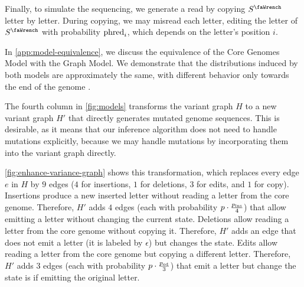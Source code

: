 Finally, to simulate the sequencing, we generate a read by copying $\seq^\gmut$ letter by letter.
During copying, we may misread each letter, editing the  letter of $\seq^\gmut$ with probability $\text{phred}_{i}$, which depends on the letter's position $i$.

In \cref{app:model-equivalence}, we discuss the equivalence of the Core Genomes Model with the Graph Model.
We demonstrate that the distributions induced by both models are approximately the same, with different behavior only towards the end of the genome .

The fourth column in \cref{fig:models} transforms the variant graph $H$ to a new variant graph $H'$ that directly generates mutated genome sequences.
This is desirable, as it means that our inference algorithm does not need to handle mutations explicitly, because we may handle mutations by incorporating them into the variant graph directly.

\cref{fig:enhance-variance-graph} shows this transformation, which replaces every edge $e$ in $H$ by $9$ edges ($4$ for insertions, $1$ for deletions, $3$ for edits, and $1$ for copy).
Insertions produce a new inserted letter without reading a letter from the core genome.
Therefore, $H'$ adds $4$ edges (each with probability $p \cdot \frac{p_\text{ins}}{4}$) that allow emitting a letter without changing the current state.
Deletions allow reading a letter from the core genome without copying it.
Therefore, $H'$ adds an edge that does not emit a letter (it is labeled by $\epsilon$) but changes the state.
Edits allow reading a letter from the core genome but copying a different letter.
Therefore, $H'$ adds $3$ edges (each with probability $p \cdot \frac{p_\text{ed}}{3}$) that emit a letter but change the state is if emitting the original letter.

